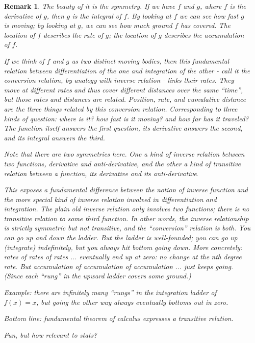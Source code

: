 \documentclass[reqno,12pt]{tufte-book}
\numberwithin{equation}{subsection}
\newtheorem{remark}{Remark}
\begin{document}
\begin{remark}
  The beauty of it is the symmetry.  If we have \(f\) and \(g\), where
  \(f\) is the derivative of \(g\), then \(g\) is the integral of
  \(f\).  By looking at \(f\) we can see how fast \(g\) is moving; by
  looking at \(g\), we can see how much ground \(f\) has covered.  The
  location of \(f\) describes the rate of \(g\); the location of \(g\)
  describes the accumulation of \(f\).

  If we think of \(f\) and \(g\) as two distinct moving bodies, then
  this fundamental relation between differentiation of the one and
  integration of the other - call it the conversion relation, by
  analogy with inverse relation - links their rates.  They move at
  different rates and thus cover different distances over the same
  ``time'', but those rates and distances are related.  Position,
  rate, and cumulative distance are the three things related by this
  conversion relation.  Corresponding to three kinds of question:
  where is it? how fast is it moving? and how far has it traveled?
  The function itself answers the first question, its derivative
  answers the second, and its integral answers the third.

  Note that there are two symmetries here.  One a kind of inverse
  relation between two functions, derivative and anti-derivative, and
  the other a kind of transitive relation between a function, its
  derivative and its anti-derivative.

  This exposes a fundamental difference between the notion of inverse
  function and the more special kind of inverse relation involved in
  differentiation and integration.  The plain old inverse relation
  only involves two functions; there is no transitive relation to some
  third function.  In other words, the inverse relationship is
  strictly symmetric but not transitive, and the ``conversion''
  relation is both.  You can go up and down the ladder.  But the
  ladder is well-founded; you can go up (integrate) indefinitely, but
  you always hit bottom going down.  More concretely: rates of rates
  of rates ... eventually end up at zero: no change at the nth degree
  rate.  But accumulation of accumulation of accumulation ... just
  keeps going.  (Since each ``rung'' in the upward ladder covers some
  ground.)

  Example: there are infinitely many ``rungs'' in the integration
  ladder of \(f(x)=x\), but going the other way always eventually
  bottoms out in zero.

  Bottom line: fundamental theorem of calculus expresses a transitive
  relation.

  Fun, but how relevant to stats?

\end{remark}
\end{document}
